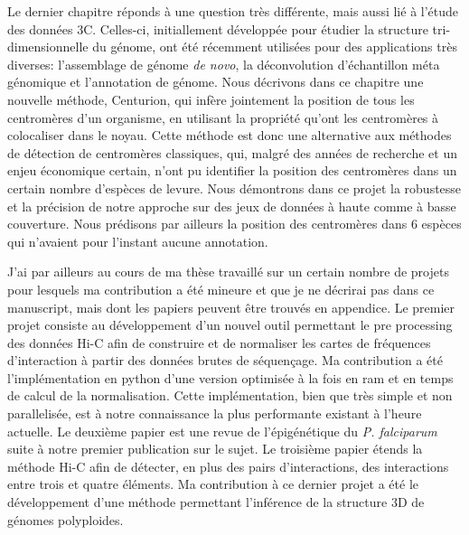 \begin{resumes}
Le dernier chapitre réponds à une question très différente, mais aussi lié à
l'étude des données 3C. Celles-ci, initiallement développée pour étudier la
structure tri-dimensionnelle du génome, ont été récemment utilisées pour des
applications très diverses: l'assemblage de génome {\em de novo}, la
déconvolution d'échantillon méta génomique et l'annotation de génome. Nous
décrivons dans ce chapitre une nouvelle méthode, Centurion, qui infère
jointement la position de tous les centromères d'un organisme, en utilisant la
propriété qu'ont les centromères à colocaliser dans le noyau. Cette méthode
est donc une alternative aux méthodes de détection de centromères classiques,
qui, malgré des années de recherche et un enjeu économique certain,
n'ont pu identifier la position des
centromères dans un certain nombre d'espèces de levure. Nous démontrons dans ce
projet la robustesse et la précision de notre approche sur des jeux de données
à haute comme à basse couverture. Nous prédisons par ailleurs la position des
centromères dans 6 espèces qui n'avaient pour l'instant aucune annotation.

J'ai par ailleurs au cours de ma thèse travaillé sur un certain nombre de
projets pour lesquels ma contribution a été mineure et que je ne décrirai pas
dans ce manuscript, mais dont les papiers peuvent être trouvés en appendice.
Le premier projet consiste au développement d'un nouvel outil permettant le
pre processing des données Hi-C afin de construire et de normaliser les cartes de fréquences
d'interaction à partir des données brutes de
séquençage. Ma contribution a été l'implémentation en python d'une version
optimisée à la fois en ram et en temps de calcul de la normalisation. Cette
implémentation, bien que très simple et non parallelisée, est à
notre connaissance la plus performante existant à l'heure actuelle. Le
deuxième papier est une revue de l'épigénétique du {\em P. falciparum} suite à
notre premier publication sur le sujet. Le troisième papier étends la méthode
Hi-C afin de détecter, en plus des pairs d'interactions, des interactions
entre trois et quatre éléments. Ma contribution à ce dernier projet a été le
développement d'une méthode permettant l'inférence de la structure 3D de
génomes polyploides.

\end{resumes}


